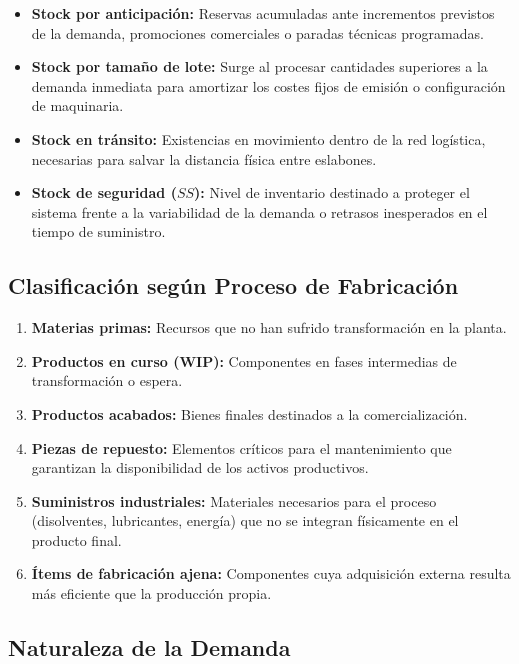 \documentclass[11pt,a4paper]{article}
\begin{document}
\begin{itemize}
    \item \textbf{Stock por anticipación:} Reservas acumuladas ante incrementos previstos de la demanda, promociones comerciales o paradas técnicas programadas.
    \item \textbf{Stock por tamaño de lote:} Surge al procesar cantidades superiores a la demanda inmediata para amortizar los costes fijos de emisión o configuración de maquinaria.
    \item \textbf{Stock en tránsito:} Existencias en movimiento dentro de la red logística, necesarias para salvar la distancia física entre eslabones.
    \item \textbf{Stock de seguridad ($SS$):} Nivel de inventario destinado a proteger el sistema frente a la variabilidad de la demanda o retrasos inesperados en el tiempo de suministro.

\end{itemize}
\subsection{Clasificación según Proceso de Fabricación}

\begin{enumerate}
    \item \textbf{Materias primas:} Recursos que no han sufrido transformación en la planta.
    \item \textbf{Productos en curso (WIP):} Componentes en fases intermedias de transformación o espera.
    \item \textbf{Productos acabados:} Bienes finales destinados a la comercialización.
    \item \textbf{Piezas de repuesto:} Elementos críticos para el mantenimiento que garantizan la disponibilidad de los activos productivos.
    \item \textbf{Suministros industriales:} Materiales necesarios para el proceso (disolventes, lubricantes, energía) que no se integran físicamente en el producto final.
    \item \textbf{Ítems de fabricación ajena:} Componentes cuya adquisición externa resulta más eficiente que la producción propia.

\end{enumerate}
\subsection{Naturaleza de la Demanda}
\end{document}
